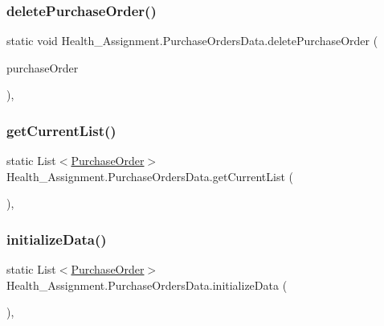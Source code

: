 \subsubsection{\texorpdfstring{delete\+Purchase\+Order()}{deletePurchaseOrder()}}
{\footnotesize\ttfamily static void Health\+\_\+\+Assignment.\+Purchase\+Orders\+Data.\+delete\+Purchase\+Order (\begin{DoxyParamCaption}\item[{\hyperlink{class_health___assignment_1_1_purchase_order}{Purchase\+Order}}]{purchase\+Order }\end{DoxyParamCaption})\hspace{0.3cm}{\ttfamily [inline]}, {\ttfamily [static]}}

\mbox{\label{class_health___assignment_1_1_purchase_orders_data_aef768684a04943e77d24185aa0ba0641}} 
\subsubsection{\texorpdfstring{get\+Current\+List()}{getCurrentList()}}
{\footnotesize\ttfamily static List$<$\hyperlink{class_health___assignment_1_1_purchase_order}{Purchase\+Order}$>$ Health\+\_\+\+Assignment.\+Purchase\+Orders\+Data.\+get\+Current\+List (\begin{DoxyParamCaption}{ }\end{DoxyParamCaption})\hspace{0.3cm}{\ttfamily [inline]}, {\ttfamily [static]}}

\mbox{\label{class_health___assignment_1_1_purchase_orders_data_af854843557eaab98f73ab7ef3976aeb8}} 
\subsubsection{\texorpdfstring{initialize\+Data()}{initializeData()}}
{\footnotesize\ttfamily static List$<$\hyperlink{class_health___assignment_1_1_purchase_order}{Purchase\+Order}$>$ Health\+\_\+\+Assignment.\+Purchase\+Orders\+Data.\+initialize\+Data (\begin{DoxyParamCaption}{ }\end{DoxyParamCaption})\hspace{0.3cm}{\ttfamily [inline]}, {\ttfamily [static]}}



